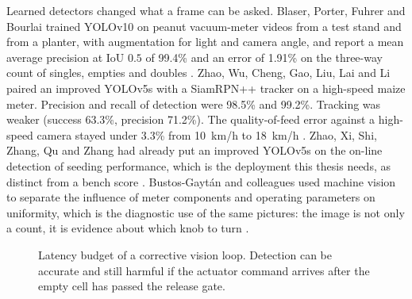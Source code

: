 Learned detectors changed what a frame can be asked. Blaser, Porter, Fuhrer and Bourlai trained YOLOv10 on peanut vacuum-meter videos from a test stand and from a planter, with augmentation for light and camera angle, and report a mean average precision at IoU \(0.5\) of \num{99.4}\% and an error of \num{1.91}\% on the three-way count of singles, empties and doubles \cite{blaser2024,wang2024yolov10}. Zhao, Wu, Cheng, Gao, Liu, Lai and Li paired an improved YOLOv5s with a SiamRPN++ tracker on a high-speed maize meter. Precision and recall of detection were \num{98.5}\% and \num{99.2}\%. Tracking was weaker (success \num{63.3}\%, precision \num{71.2}\%). The quality-of-feed error against a high-speed camera stayed under \num{3.3}\% from \SI{10}{km/h} to \SI{18}{km/h} \cite{zhao2025yolo}. Zhao, Xi, Shi, Zhang, Qu and Zhang had already put an improved YOLOv5s on the on-line detection of seeding performance, which is the deployment this thesis needs, as distinct from a bench score \cite{zhaoJ2023}. Bustos-Gayt{\'a}n and colleagues used machine vision to separate the influence of meter components and operating parameters on uniformity, which is the diagnostic use of the same pictures: the image is not only a count, it is evidence about which knob to turn \cite{bustos2025}.

\begin{figure}[ht]
\centering
{}
\caption{Latency budget of a corrective vision loop. Detection can be accurate and still harmful if the actuator command arrives after the empty cell has passed the release gate.}
\label{fig:latency}
\end{figure}

